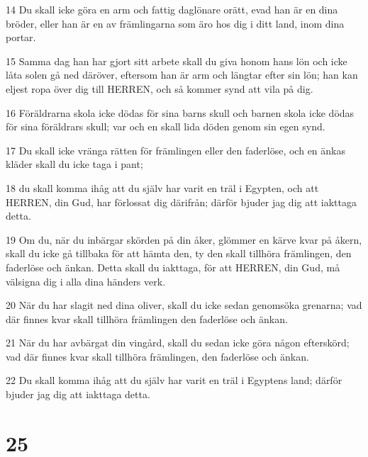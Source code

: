 \par 14 Du skall icke göra en arm och fattig daglönare orätt, evad han är en dina bröder, eller han är en av främlingarna som äro hos dig i ditt land, inom dina portar.
\par 15 Samma dag han har gjort sitt arbete skall du giva honom hans lön och icke låta solen gå ned däröver, eftersom han är arm och längtar efter sin lön; han kan eljest ropa över dig till HERREN, och så kommer synd att vila på dig.
\par 16 Föräldrarna skola icke dödas för sina barns skull och barnen skola icke dödas för sina föräldrars skull; var och en skall lida döden genom sin egen synd.
\par 17 Du skall icke vränga rätten för främlingen eller den faderlöse, och en änkas kläder skall du icke taga i pant;
\par 18 du skall komma ihåg att du själv har varit en träl i Egypten, och att HERREN, din Gud, har förlossat dig därifrån; därför bjuder jag dig att iakttaga detta.
\par 19 Om du, när du inbärgar skörden på din åker, glömmer en kärve kvar på åkern, skall du icke gå tillbaka för att hämta den, ty den skall tillhöra främlingen, den faderlöse och änkan. Detta skall du iakttaga, för att HERREN, din Gud, må välsigna dig i alla dina händers verk.
\par 20 När du har slagit ned dina oliver, skall du icke sedan genomsöka grenarna; vad där finnes kvar skall tillhöra främlingen den faderlöse och änkan.
\par 21 När du har avbärgat din vingård, skall du sedan icke göra någon efterskörd; vad där finnes kvar skall tillhöra främlingen, den faderlöse och änkan.
\par 22 Du skall komma ihåg att du själv har varit en träl i Egyptens land; därför bjuder jag dig att iakttaga detta.

\chapter{25}

